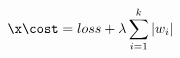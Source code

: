 \documentclass[preview]{standalone}
\begin{document}
\begin{align*}
\x\cost = loss + \lambda\sum_{i=1}^{k}\left|w_{i}\right|
\end{align*}
\end{document}
